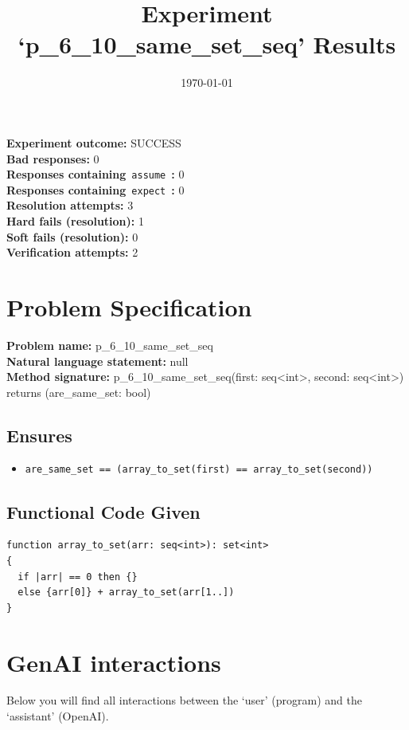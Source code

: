 \documentclass{article}
\begin{document}
\title{Experiment `p\_6\_10\_same\_set\_seq' Results}
\author{\today}
\date{}
\maketitle
\textbf{Experiment outcome: }SUCCESS
\\\textbf{Bad responses: }0
\\\textbf{Responses containing}~\texttt{assume}~\textbf{: }0
\\\textbf{Responses containing}~\texttt{expect}~\textbf{: }0
\\\textbf{Resolution attempts: }3
\\\textbf{Hard fails (resolution): }1
\\\textbf{Soft fails (resolution): }0
\\\textbf{Verification attempts: }2
\section*{Problem Specification}
\textbf{Problem name: }p\_6\_10\_same\_set\_seq
\\\textbf{Natural language statement: }null
\\\textbf{Method signature: }p\_6\_10\_same\_set\_seq(first: seq<int>, second: seq<int>) returns (are\_same\_set: bool)
\subsection*{Ensures}
\begin{itemize}
\item \texttt{are\_same\_set == (array\_to\_set(first) == array\_to\_set(second))}
\end{itemize}
\subsection*{Functional Code Given}
\begin{lstlisting}
function array_to_set(arr: seq<int>): set<int>
{
  if |arr| == 0 then {}
  else {arr[0]} + array_to_set(arr[1..])
}
\end{lstlisting}
\clearpage
\section*{GenAI interactions}
Below you will find all interactions between the `user' (program) and the `assistant' (OpenAI).
\end{document}

